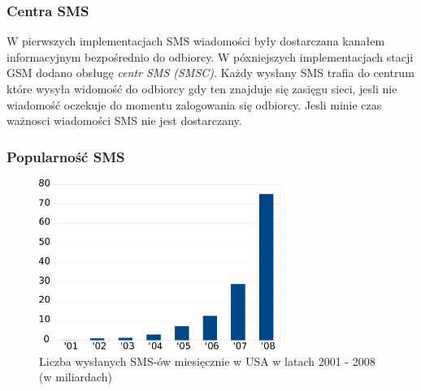 \documentclass[xcolor=table]{beamer}
\begin{document}
\begin{frame}
  \frametitle{Centra SMS}

  W pierwszych implementacjach SMS wiadomości były dostarczana kanałem
  informacyjnym bezpośrednio do odbiorcy. W póxniejszych implementacjach stacji
  GSM dodano obsługę \emph{centr SMS (SMSC)}. Każdy wysłany SMS trafia do
  centrum które wysyła widomość do odbiorcy gdy ten znajduje się zasięgu sieci,
  jesli nie wiadomość oczekuje do momentu zalogowania się odbiorcy. Jesli minie
  czas ważnosci wiadomości SMS nie jest dostarczany.
\end{frame}

\begin{frame}
  \frametitle{Popularność SMS}

  \begin{center}
    \begin{figure}
      \includegraphics[width=0.7\textwidth]{sms_sent_monthly}
      \caption{Liczba wysłanych SMS-ów miesięcznie w USA w latach 2001 - 2008
      (w miliardach)}
    \end{figure}
  \end{center}
\end{frame}


\end{document}
